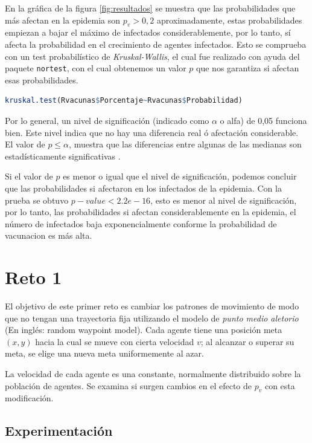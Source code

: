 \documentclass{article}
\begin{document}
En la gr\'afica de la figura \ref{fig:resultados} se muestra que las probabilidades que m\'as afectan en la epidemia son $p_v > 0,2$ aproximadamente, estas probabilidades empiezan a bajar el m\'aximo de infectados considerablemente, por lo tanto, s\'i afecta la probabilidad en el crecimiento de agentes infectados. Esto se comprueba con un test probabil\'istico de \textit{Kruskal-Wallis}, el cual fue realizado con ayuda del paquete \texttt{nortest}, con el cual obtenemos un valor $p$ que nos garantiza si afectan esas probabilidades.

\begin{lstlisting}[language=R]
kruskal.test(Rvacunas$Porcentaje~Rvacunas$Probabilidad)
\end{lstlisting}

Por lo general, un nivel de significaci\'on (indicado como $\alpha $ o alfa) de 0,05 funciona bien. Este nivel indica que no hay una diferencia real \'o afectaci\'on considerable. El valor de $p \leq  \alpha $, muestra que las diferencias entre algunas de las medianas son estad\'isticamente significativas \cite{kruskal}.

Si el valor de $p$ es menor o igual que el nivel de significaci\'on, podemos concluir que las probabilidades si afectaron en los infectados de la epidemia.
Con la prueba se obtuvo $p-value < 2.2 e-16$, esto es menor al nivel de significaci\'on, por lo tanto, las probabilidades si afectan considerablemente en la epidemia, el n\'umero de infectados baja exponencialmente conforme la probabilidad de vacunacion es m\'as alta.

\section{Reto 1}

El objetivo de este primer reto es cambiar los patrones de movimiento de modo que no tengan una trayectoria fija utilizando el modelo de \textit{punto medio aletorio} (En ingl\'es: random waypoint model).
Cada agente tiene una posici\'on meta $(x,y)$ hacia la cual se mueve con cierta velocidad $v$; al alcanzar o superar su meta, se elige una nueva meta uniformemente al azar. 

La velocidad de cada agente es una constante, normalmente distribuido sobre la poblaci\'on de agentes. Se examina si surgen cambios en el efecto de $p_v$  con esta modificaci\'on.

\subsection{Experimentaci\'on}
\end{document}
